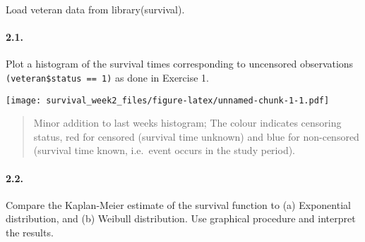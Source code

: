 \documentclass[]{article}
\newenvironment{Shaded}{\begin{snugshade}}{\end{snugshade}}
\newcommand{\KeywordTok}[1]{\textcolor[rgb]{0.13,0.29,0.53}{\textbf{#1}}}
\newcommand{\DataTypeTok}[1]{\textcolor[rgb]{0.13,0.29,0.53}{#1}}
\newcommand{\DecValTok}[1]{\textcolor[rgb]{0.00,0.00,0.81}{#1}}
\newcommand{\StringTok}[1]{\textcolor[rgb]{0.31,0.60,0.02}{#1}}
\newcommand{\OperatorTok}[1]{\textcolor[rgb]{0.81,0.36,0.00}{\textbf{#1}}}
\newcommand{\NormalTok}[1]{#1}
\let\oldparagraph\paragraph
\renewcommand{\paragraph}[1]{\oldparagraph{#1}\mbox{}}
\begin{document}
Load veteran data from library(survival).

\paragraph{2.1.}\label{section-3}

Plot a histogram of the survival times corresponding to uncensored
observations \texttt{(veteran\$status\ ==\ 1)} as done in Exercise 1.

\begin{Shaded}
\end{Shaded}

\texttt{[image: survival\_week2\_files/figure-latex/unnamed-chunk-1-1.pdf]}

\begin{quote}
Minor addition to last weeks histogram; The colour indicates censoring
status, red for censored (survival time unknown) and blue for
non-censored (survival time known, i.e.~event occurs in the study
period).
\end{quote}

\paragraph{2.2.}\label{section-4}

Compare the Kaplan-Meier estimate of the survival function to (a)
Exponential distribution, and (b) Weibull distribution. Use graphical
procedure and interpret the results.
\end{document}
